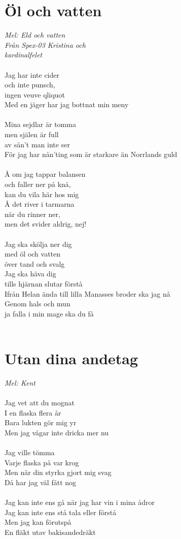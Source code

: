 \documentclass[a5paper,15pt]{article}
\begin{document}
\section{Öl och vatten}
\emph{Mel: Eld och vatten\\
Från Spex-03 Kristina och \\kardinalfelet} \\
\\
Jag har inte cider \\och inte punsch,\\ingen veuve qliquot\\Med en jäger har jag bottnat min meny\\
\\
Mina sejdlar är tomma \\men själen är full\\av sån't man inte ser\\För jag har nån'ting som är starkare än Norrlands guld\\
\\
Å om jag tappar balansen \\ och faller ner på knä,\\kan du vila här hos mig\\Å det river i tarmarna \\när du rinner ner,\\men det svider aldrig, nej!\\
\\
Jag ska skölja ner dig \\med öl och vatten\\över tand och svalg\\Jag ska häva dig \\tills hjärnan slutar förstå\\Ifrån Helan ända till lilla Manasses broder ska jag nå\\Genom hals och mun \\ja falla i min mage ska du få\\
\\

\section{Utan dina andetag}
\emph{Mel: Kent}\\
\\
Jag vet att du mognat\\
I en flaska flera år\\
Bara lukten gör mig yr\\
Men jag vågar inte dricka mer nu\\
\\
Jag ville tömma\\
Varje flaska på var krog\\
Men när din styrka gjort mig svag\\
Då har jag väl fått nog\\
\\
Jag kan inte ens gå när jag har vin i mina ådror\\
Jag kan inte ens stå tala eller förstå\\
Men jag kan förutspå\\
En fläkt utav bakisandedräkt
\\
\end{document}
